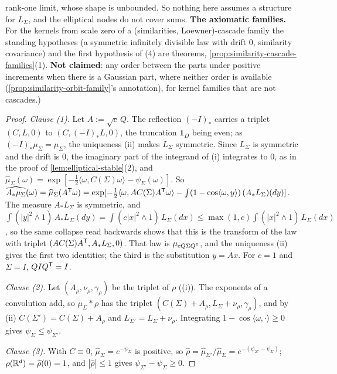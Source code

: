 \begin{proposition}
{rank-one limit, whose shape is unbounded. So nothing here assumes a structure for $L_\Sigma$, and
the elliptical nodes do not cover sums. \textbf{The axiomatic families.} For the kernels from scale zero of a (similarities, Loewner)-cascade family the standing hypotheses (a symmetric infinitely
divisible law with drift $0$, similarity covariance) and the first hypothesis of (4) are theorems,
\ref{prop:similarity-cascade-families}(1). \textbf{Not claimed}: any order between the parts under
positive increments when there is a Gaussian part, where neither order is available
(\ref{prop:similarity-orbit-family}'s annotation), for kernel families that are not cascades.)}
\end{proposition}

\begin{proof}
\leanok
\emph{Clause (1).} Let $A := \sqrt c\,Q$. The reflection $(-I)_*$ carries a triplet $(C, L, 0)$ to
$(C, (-I)_*L, 0)$, the truncation $\mathbf 1_D$ being even; as $(-I)_*\mu_\Sigma = \mu_\Sigma$, the uniqueness
(ii) makes $L_\Sigma$ symmetric. Since $L_\Sigma$ is symmetric and the drift is $0$, the
imaginary part of the integrand of (i) integrates to $0$, as in the proof of
\ref{lem:elliptical-stable}(2), and
$\widehat\mu_\Sigma(\omega) = \exp[-\tfrac12\langle\omega,C(\Sigma)\omega\rangle - \psi_\Sigma(\omega)]$.
So $\widehat{A_*\mu_\Sigma}(\omega) = \widehat\mu_\Sigma(A^{\mathsf{T}}\omega) =
\exp[-\tfrac12\langle\omega,AC(\Sigma)A^{\mathsf{T}}\omega\rangle - \int(1 - \cos\langle\omega,y\rangle)\,
(A_*L_\Sigma)(dy)]$. The measure $A_*L_\Sigma$ is symmetric, and
$\int(|y|^2 \wedge 1)\,A_*L_\Sigma(dy) = \int(c|x|^2 \wedge 1)\,L_\Sigma(dx) \le \max(1,c)\int(|x|^2 \wedge
1)\,L_\Sigma(dx)$, so the same collapse read backwards shows that this is the transform of the law
with triplet $(AC(\Sigma)A^{\mathsf{T}}, A_*L_\Sigma, 0)$. That law is $\mu_{cQ\Sigma Q^{\mathsf{T}}}$, and the
uniqueness (ii) gives the first two identities; the third is the substitution
$y = Ax$. For $c = 1$ and $\Sigma = I$, $QIQ^{\mathsf{T}} = I$.

\emph{Clause (2).} Let $(A_\rho, \nu_\rho, \gamma_\rho)$ be the triplet of $\rho$
((i)). The exponents of a convolution add, so $\mu_\Sigma * \rho$ has the triplet
$(C(\Sigma) + A_\rho, L_\Sigma + \nu_\rho, \gamma_\rho)$, and by (ii)
$C(\Sigma') = C(\Sigma) + A_\rho$ and $L_{\Sigma'} = L_\Sigma + \nu_\rho$. Integrating
$1 - \cos\langle\omega,\cdot\rangle \ge 0$ gives $\psi_\Sigma \le \psi_{\Sigma'}$.

\emph{Clause (3).} With $C \equiv 0$, $\widehat\mu_\Sigma = e^{-\psi_\Sigma}$ is positive, so
$\widehat\rho = \widehat\mu_{\Sigma'}/\widehat\mu_\Sigma = e^{-(\psi_{\Sigma'} - \psi_\Sigma)}$;
$\rho(\mathbb{R}^d) = \widehat\rho(0) = 1$, and $|\widehat\rho| \le 1$ gives $\psi_{\Sigma'} - \psi_\Sigma \ge 0$.


\end{proof}
